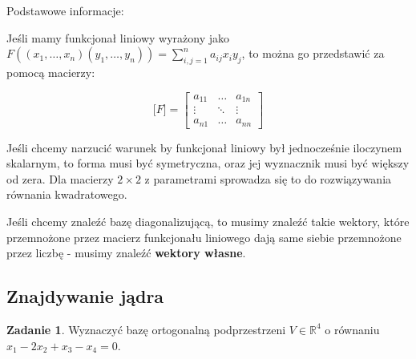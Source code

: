 \documentclass[11pt]{article}
\theoremstyle{definition}
\newtheorem{zadanie}{Zadanie}
\begin{document}
Podstawowe informacje:

Jeśli mamy funkcjonał liniowy wyrażony jako $F((x_1,\dots,x_n)(y_1,\dots,y_n)) = \sum_{i,j=1}^na_{ij}x_iy_j$, to można go przedstawić za pomocą macierzy:

$$\Big[F\Big] = \begin{bmatrix}
    a_{11} & \dots & a_{1n}\\
    \vdots & \ddots & \vdots\\
    a_{n1} & \dots & a_{nn}
    \end{bmatrix}$$

    Jeśli chcemy narzucić warunek by funkcjonał liniowy był jednocześnie iloczynem skalarnym, to forma musi być symetryczna, oraz jej wyznacznik musi być większy od zera. Dla macierzy $2\times2$ z parametrami sprowadza się to do rozwiązywania równania kwadratowego.

    Jeśli chcemy znaleźć bazę diagonalizującą, to musimy znaleźć takie wektory, które przemnożone przez macierz funkcjonału liniowego dają same siebie przemnożone przez liczbę - musimy znaleźć \textbf{wektory własne}.
\subsection{Znajdywanie jądra}

\begin{zadanie}
Wyznaczyć bazę ortogonalną podprzestrzeni $V\in \mathbb R^4$ o równaniu $x_1-2x_2+x_3-x_4=0$.
\end{zadanie}
\end{document}
